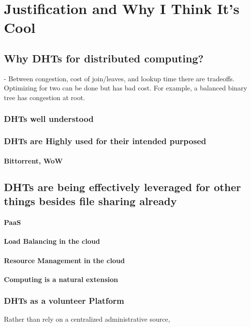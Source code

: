 \documentclass[10pt,letterpaper,twoside]{report}
\begin{document}

\chapter{Justification and Why I Think It's Cool}

\section{Why DHTs for distributed computing?}

\cite{malkhi2001viceroy} -  Between congestion, cost of join/leaves, and lookup time there are tradeoffs.  
Optimizing for two can be done but has bad cost.
For example, a balanced binary tree has congestion at root.
\subsection{DHTs well understood}
\subsection{DHTs are Highly used for their intended purposed}
\subsubsection{Bittorrent, WoW}
\section{DHTs are being effectively leveraged for other things besides file sharing already}

\subsubsection{PaaS}
\subsubsection{Load Balancing in the cloud}
\subsubsection{Resource Management in the cloud}
\subsubsection{Computing is a natural extension}

\subsection{DHTs as a volunteer Platform}
Rather than rely on a centralized administrative source,
\end{document}
